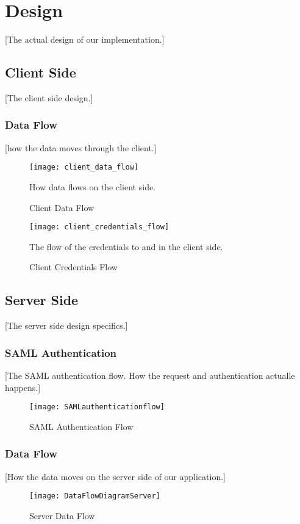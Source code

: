 \section{Design}\label{design}
    [The actual design of our implementation.]
    \subsection{Client Side}\label{clientdesign}
        [The client side design.]
        \subsubsection{Data Flow}\label{dataflow}
        [how the data moves through the client.]
            \begin{figure}[htb]
            \centering
            \texttt{[image: client\_data\_flow]}
            \caption{Client Data Flow}
            How data flows on the client side.
            \label{fig:clientdata}
        \end{figure}
        
        \begin{figure}[htb]
            \centering
            \texttt{[image: client\_credentials\_flow]}
            \caption{Client Credentials Flow}
            The flow of the credentials to and in the client side.
            \label{fig:clientcredentials}
        \end{figure}
        
    \subsection{Server Side}\label{serverdesign}
        [The server side design specifics.]
        \subsubsection{SAML Authentication}\label{samlauth}
            [The SAML authentication flow. How the request and authentication actualle happens.]
            \begin{figure}[htb]
                \centering
                \texttt{[image: SAMLauthenticationflow]}
                \caption{SAML Authentication Flow}
                \label{fig:SAMLflow}
            \end{figure}
        
        \subsubsection{Data Flow}\label{serverdataflow}
            [How the data moves on the server side of our application.]
            \begin{figure}[htb]
                \centering
                \texttt{[image: DataFlowDiagramServer]}
                \caption{Server Data Flow}
                \label{fig:serverDataFlow}
            \end{figure}

